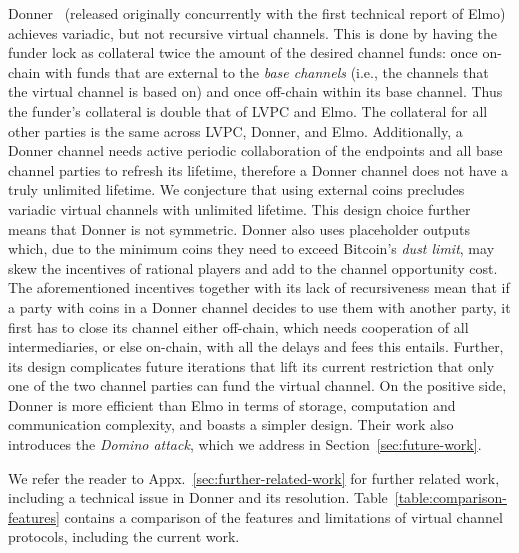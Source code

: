   Donner~\cite{donner}
    (released originally concurrently with the first technical report of Elmo) 
achieves variadic, but not recursive
  virtual channels. This is
  done by having the funder lock as
  collateral twice the amount of the desired channel funds: once on-chain with
  funds that are external to the \emph{base channels} (i.e., the channels that the
  virtual channel is based on) and once off-chain within its base channel. Thus
  the funder's collateral is double that of LVPC and Elmo. The
  collateral for all other parties is the same
  across LVPC, Donner, and Elmo.
  Additionally, a Donner channel needs active periodic collaboration of the
  endpoints and all base channel parties to refresh
  its lifetime, therefore a Donner channel does not have a truly unlimited
  lifetime. We conjecture that using external coins precludes variadic
  virtual channels with unlimited lifetime. This
  design choice further means that Donner is not symmetric. Donner also uses
  placeholder outputs which, due to the minimum coins they need to
  exceed Bitcoin's \emph{dust limit}, may skew the incentives of rational players
  and add to the channel
  opportunity cost. The aforementioned incentives
  together with its lack of recursiveness mean that if a party with coins in a
  Donner channel decides to use them with another party, it first has to close
  its channel either off-chain, which needs cooperation of all intermediaries, or
  else on-chain, with all the delays and fees this entails.
  Further, its design complicates
  future iterations that lift its current restriction that only one of the two
  channel parties can fund the virtual channel. On the positive side, Donner is
  more efficient than Elmo in terms of storage, computation and communication
  complexity, and boasts a simpler design. 
  Their work also introduces the \emph{Domino attack},
  which we address in Section~\ref{sec:future-work}.

  We refer the reader to Appx.~\ref{sec:further-related-work} for further
  related work, including a technical issue in Donner and its resolution.
  Table~\ref{table:comparison-features} contains a comparison of the
  features and limitations of virtual channel protocols, including the current
  work.

